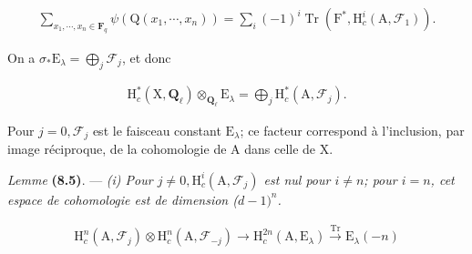 \documentclass[10pt,leqno]{article}
\begin{document}
\begin{equation*}\begin{gathered}\sum _{x_{1},\cdots ,x_{n} \in  \mathbf{F}_{q}} \psi (\mathrm{Q}(x_{1},\cdots ,x_{n})) = \sum _{i} (-1)^{i} \operatorname{Tr}(\mathrm{F}^{*}, \mathrm{H}_{c}^{i}(\mathrm{A},\mathcal{F} _{1})).\end{gathered}\tag{8.4.2}\end{equation*}

\noindent On a \(\sigma _{*}\mathrm{E}_{\lambda } = \bigoplus\limits_{j} \mathcal{F} _{j}\), et donc\par

\begin{equation*}\begin{gathered}\mathrm{H}_{c}^{*}(\mathrm{X},\mathbf{Q}_{\ell }) \otimes _{\mathbf{Q}_{\ell }} \mathrm{E}_{\lambda } = \bigoplus\limits_{j} \mathrm{H}_{c}^{*}(\mathrm{A},\mathcal{F} _{j}).\end{gathered}\tag{8.4.3}\end{equation*}

\noindent Pour \(j = 0, \mathcal{F} _{j}\) est le faisceau constant \(\mathrm{E}_{\lambda }\); ce facteur correspond à l'inclusion, par image réciproque, de la cohomologie de \(\mathrm{A}\) dans celle de \(\mathrm{X}\).\par

\noindent \emph{Lemme} \textbf{(8.5)}. — {\itshape \textup{(i)} Pour \(j \ne  0, \mathrm{H}_{c}^{i}(\mathrm{A},\mathcal{F} _{j})\) est nul pour \(i \ne  n\); pour \(i = n\), cet espace de cohomologie est de dimension (\(d-1)^{n}\).}\par

\par

\begin{equation*}\begin{gathered}\mathrm{H}_{c}^{n}(\mathrm{A},\mathcal{F} _{j}) \otimes  \mathrm{H}_{c}^{n}(\mathrm{A},\mathcal{F} _{-j}) \longrightarrow  \mathrm{H}_{c}^{2n}(\mathrm{A},\mathrm{E}_{\lambda }) \xrightarrow{\operatorname{Tr}} \mathrm{E}_{\lambda }(-n)\end{gathered}\end{equation*}

\par

\par
\end{document}
